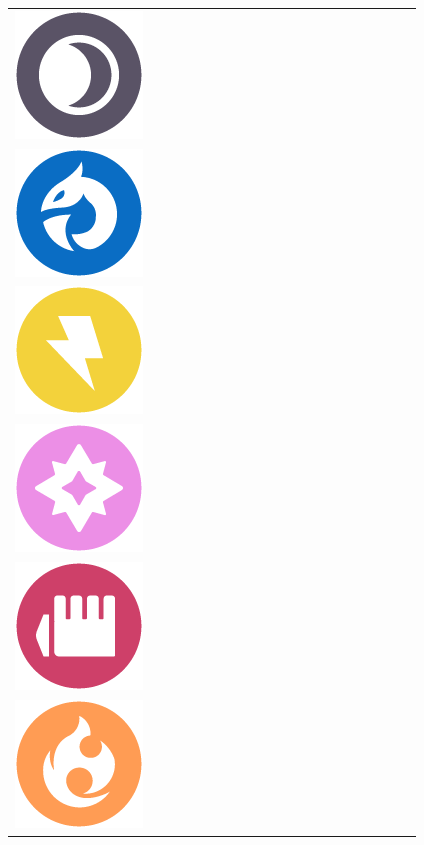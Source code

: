 \begin{table}[h]
\begin{tabular}{c c c c c c c c c c c c c c c c c c c c}
    \includegraphics[scale=.1]{images/dark.png} \\
    \includegraphics[scale=.1]{images/dragon.png} \\
    \includegraphics[scale=.1]{images/electric.png} \\
    \includegraphics[scale=.1]{images/fairy.png} \\
    \includegraphics[scale=.1]{images/fighting.png} \\
  \includegraphics[scale=.1]{images/fire.png} \\

\end{tabular}
\end{table}
